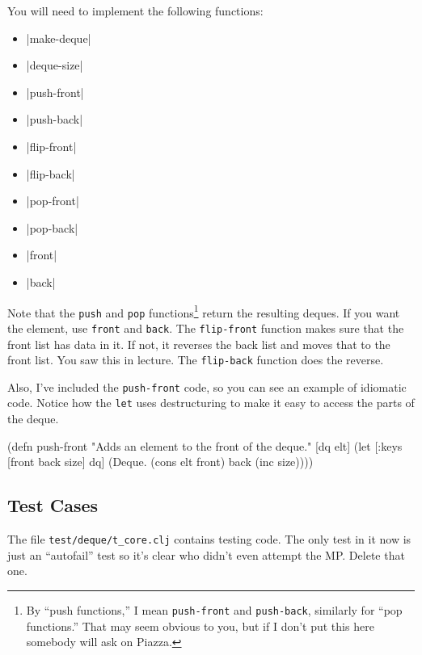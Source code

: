 \documentclass[12pt]{article}
\begin{document}
You will need to implement the following
functions:

\begin{itemize}
\item {}|make-deque|
\item {}|deque-size|
\item {}|push-front|
\item {}|push-back|
\item {}|flip-front|
\item {}|flip-back|
\item {}|pop-front|
\item {}|pop-back|
\item {}|front|
\item {}|back|
\end{itemize}

Note that the \texttt{push} and \texttt{pop} functions\footnote{By
  ``push functions,'' I mean \texttt{push-front} and \texttt{push-back},
  similarly for ``pop functions.''  That may seem obvious to you, but if
  I don't put this here somebody will ask on Piazza.} return the
resulting deques.  If you want the element, use \texttt{front} and
\texttt{back}.  The \texttt{flip-front} function makes sure that the front list
has data in it.  If not, it reverses the back list and moves that to the front list.  You
saw this in lecture.  The \texttt{flip-back} function does the reverse.

Also, I've included the \texttt{push-front} code, so you can see an example of idiomatic code.
Notice how the \texttt{let} uses destructuring to make it easy to access the parts of the deque.

\begin{clojurecode}
(defn push-front
  "Adds an element to the front of the deque."
  [dq elt]
  (let [{:keys [front back size]} dq]
    (Deque. (cons elt front) back (inc size))))
\end{clojurecode}

\subsection{Test Cases}

The file \texttt{test/deque/t\_core.clj} contains testing code.  The only test in it now
is just an ``autofail'' test so it's clear who didn't even attempt the MP.  Delete that one.
\end{document}
